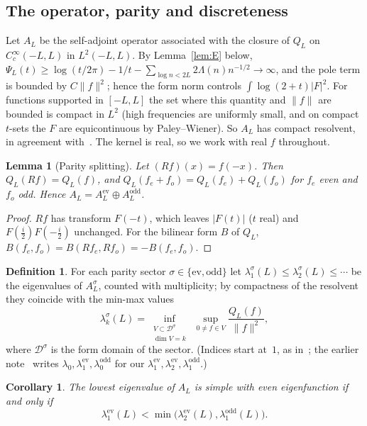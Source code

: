 \documentclass[11pt]{amsart}
\newcommand{\ev}{\mathrm{ev}}
\newcommand{\od}{\mathrm{odd}}
\newtheorem{lemma}[theorem]{Lemma}
\newtheorem{corollary}[theorem]{Corollary}
\theoremstyle{definition}
\newtheorem{definition}[theorem]{Definition}
\theoremstyle{remark}
\numberwithin{equation}{section}
\begin{document}
\subsection{The operator, parity and discreteness}
Let $A_L$ be the self-adjoint operator associated with the closure of $Q_L$ on $C_c^\infty(-L,L)$ in $L^2(-L,L)$. By Lemma~\ref{lem:E} below, $\Psi_L(t)\ge\log(t/2\pi)-1/t-\sum_{\log n<2L}2\Lambda(n)n^{-1/2}\to\infty$, and the pole term is bounded by $C\|f\|^2$; hence the form norm controls $\int\log(2+t)|F|^2$. For functions supported in $[-L,L]$ the set where this quantity and $\|f\|$ are bounded is compact in $L^2$ (high frequencies are uniformly small, and on compact $t$-sets the $F$ are equicontinuous by Paley--Wiener). So $A_L$ has compact resolvent, in agreement with~\cite[Thm.~3.6]{CCM25}. The kernel is real, so we work with real $f$ throughout.

\begin{lemma}[Parity splitting]\label{lem:parity}
Let $(Rf)(x)=f(-x)$. Then $Q_L(Rf)=Q_L(f)$, and $Q_L(f_e+f_o)=Q_L(f_e)+Q_L(f_o)$ for $f_e$ even and $f_o$ odd. Hence $A_L=A_L^{\ev}\oplus A_L^{\od}$.
\end{lemma}
\begin{proof}
$Rf$ has transform $F(-t)$, which leaves $|F(t)|$ ($t$ real) and $F(\tfrac i2)F(-\tfrac i2)$ unchanged. For the bilinear form $B$ of $Q_L$, $B(f_e,f_o)=B(Rf_e,Rf_o)=-B(f_e,f_o)$.
\end{proof}

\begin{definition}
For each parity sector $\sigma\in\{\ev,\od\}$ let $\lambda_1^\sigma(L)\le\lambda_2^\sigma(L)\le\cdots$ be the eigenvalues of $A_L^\sigma$, counted with multiplicity; by compactness of the resolvent they coincide with the min-max values
\[
\lambda_k^\sigma(L)=\inf_{\substack{V\subset\mathcal D^\sigma\\ \dim V=k}}\ \sup_{0\ne f\in V}\frac{Q_L(f)}{\|f\|^2},
\]
where $\mathcal D^\sigma$ is the form domain of the sector. (Indices start at~$1$, as in~\cite{Zhu,Elston}; the earlier note~\cite{Botha} writes $\lambda_0,\lambda_1^{\ev},\lambda_0^{\od}$ for our $\lambda_1^\ev,\lambda_2^\ev,\lambda_1^\od$.)
\end{definition}

\begin{corollary}\label{cor:criterion}
The lowest eigenvalue of $A_L$ is simple with even eigenfunction if and only if
\[
\lambda_1^\ev(L)<\min\bigl(\lambda_2^\ev(L),\lambda_1^\od(L)\bigr).
\]
\end{corollary}
\end{document}
